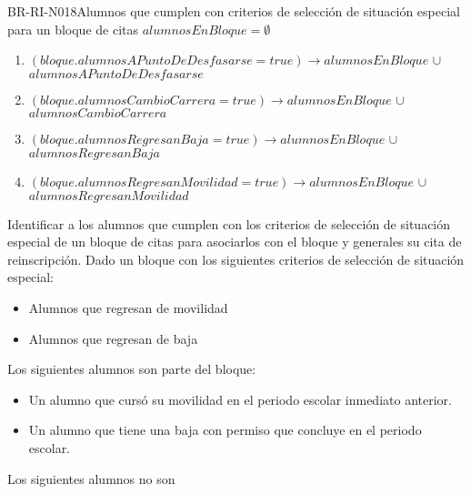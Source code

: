 \begin{BusinessRule}{BR-RI-N018}{Alumnos que cumplen con criterios de selección de situación especial para un bloque de citas}
	\BRItem[Sentencia] \cdtEmpty
	$alumnosEnBloque=\emptyset$
	\begin{enumerate}
		\item $(bloque.alumnosAPuntoDeDesfasarse=true)\rightarrow alumnosEnBloque$   $\cup$   $alumnosAPuntoDeDesfasarse$
		\item $(bloque.alumnosCambioCarrera=true)\rightarrow alumnosEnBloque$   $\cup$   $alumnosCambioCarrera$
		\item $(bloque.alumnosRegresanBaja=true)\rightarrow alumnosEnBloque$   $\cup$   $alumnosRegresanBaja$
		\item $(bloque.alumnosRegresanMovilidad=true)\rightarrow alumnosEnBloque$   $\cup$   $alumnosRegresanMovilidad$
	\end{enumerate}
	
	\BRItem[Motivación] Identificar a los alumnos que cumplen con los criterios de selección de situación especial de un bloque de citas para asociarlos con el bloque y generales su cita de reinscripción.
	\BRItem[Ejemplo] Dado un bloque con los siguientes criterios de selección de situación especial:
		\begin{itemize}
			\item Alumnos que regresan de movilidad
			\item Alumnos que regresan de baja
		\end{itemize}
	
	Los siguientes alumnos son parte del bloque:
	\begin{itemize}
		\item Un alumno que cursó su movilidad en el periodo escolar inmediato anterior.
		\item Un alumno que tiene una baja con permiso que concluye en el periodo escolar.
	\end{itemize}

	Los siguientes alumnos no son
	
\end{BusinessRule}

